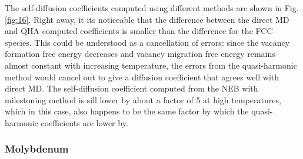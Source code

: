 \documentclass{article}
\begin{document}
The self-diffusion coefficients computed using different methods are shown in Fig. \ref{fig:16}. Right away, it its noticeable that the difference between the direct MD and QHA computed coefficients is smaller than the difference for the FCC species. This could be understood as a cancellation of errors: since the vacancy formation free energy decreases and vacancy migration free energy remains almost constant with increasing temperature, the errors from the quasi-harmonic method would cancel out to give a diffusion coefficient that agrees well with direct MD. The self-diffusion coefficient computed from the NEB with milestoning method is sill lower by about a factor of 5 at high temperatures, which in this case, also happens to be the same factor by which the quasi-harmonic coefficients are lower by.

\subsubsection{Molybdenum}
\end{document}
